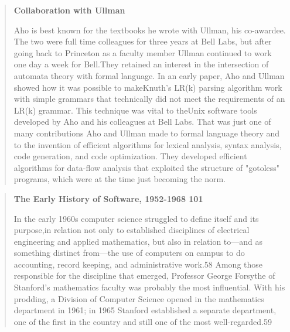 \begin{quotation}
\textbf{Collaboration with Ullman}

Aho is best known for the textbooks he wrote with Ullman, his co-awardee. 
The two were full time colleagues for three years at Bell Labs, but after 
going back to Princeton as a faculty member Ullman continued to work one day a 
week for Bell.They retained an interest in the intersection of automata theory 
with formal language. In an early paper, Aho and Ullman showed how it was 
possible to makeKnuth's LR(k) parsing algorithm work with simple grammars that 
technically did not meet the requirements of an LR(k) grammar. This technique 
was vital to theUnix software tools developed by Aho and his colleagues at Bell 
Labs. That was just one of many contributions Aho and Ullman made to formal 
language theory and to the invention of efficient algorithms for lexical 
analysis, syntax analysis, code generation, and code optimization. They 
developed efficient algorithms for data-flow analysis that exploited the 
structure of "gotoless" programs, which were at the time just becoming the norm.
\cite{aho_turing_award_2020}
\end{quotation}
\begin{quotation}
\textbf{The Early History of Software, 1952-1968 101}

In the early 1960s computer science struggled to define itself and its 
purpose,in relation not only to established disciplines of electrical 
engineering and applied mathematics, but also in relation to—and as something 
distinct from—the use of computers on campus to do accounting, record keeping, 
and administrative work.58 Among those responsible for the discipline that 
emerged, Professor George Forsythe of Stanford's mathematics faculty was 
probably the most influential. With his prodding, a Division of Computer Science 
opened in the mathematics department in 1961; in 1965 Stanford established a 
separate department, one of the first in the country and still one of the 
most well-regarded.59
\cite{history_of_modern_computing_2003_ceruzzi}
\end{quotation}
